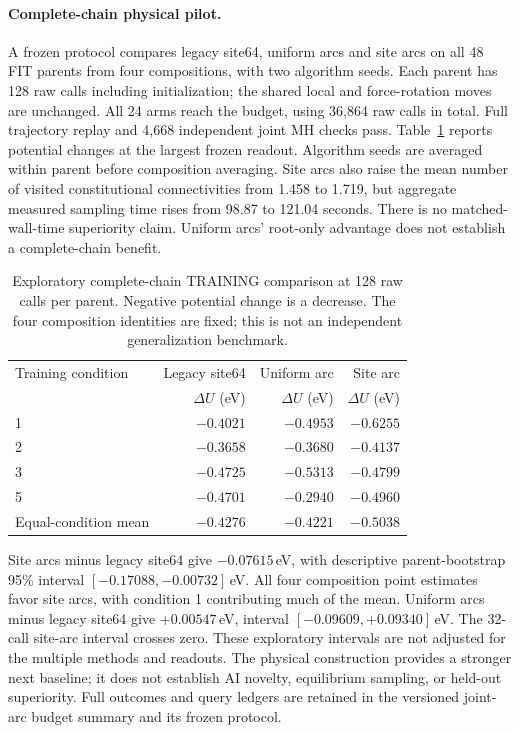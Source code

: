 \paragraph{Complete-chain physical pilot.}
A frozen protocol compares legacy site64, uniform arcs and site arcs on all 48
FIT parents from four compositions, with two algorithm seeds. Each parent has
128 raw calls including initialization; the shared local and force-rotation
moves are unchanged. All 24 arms reach the budget, using 36,864 raw calls in
total. Full trajectory replay and 4,668 independent joint MH checks pass.
Table~\ref{tab:arc-training-chain} reports potential changes at the largest
frozen readout. Algorithm seeds are averaged within parent before composition
averaging. Site arcs also raise the mean number of visited constitutional
connectivities from 1.458 to 1.719, but aggregate measured sampling time rises
from 98.87 to 121.04 seconds. There is no matched-wall-time superiority claim.
Uniform arcs' root-only advantage does not establish a complete-chain benefit.

\begin{table}[t]
\centering
\caption{Exploratory complete-chain TRAINING comparison at 128 raw calls per
parent. Negative potential change is a decrease. The four composition identities
are fixed; this is not an independent generalization benchmark.}
\label{tab:arc-training-chain}
\small
\begin{tabular}{lrrr}
\toprule
Training condition & Legacy site64 & Uniform arc & Site arc\\
 & $\Delta U$ (eV) & $\Delta U$ (eV) & $\Delta U$ (eV)\\
\midrule
1 & $-0.4021$ & $-0.4953$ & $-0.6255$\\
2 & $-0.3658$ & $-0.3680$ & $-0.4137$\\
3 & $-0.4725$ & $-0.5313$ & $-0.4799$\\
5 & $-0.4701$ & $-0.2940$ & $-0.4960$\\
Equal-condition mean & $-0.4276$ & $-0.4221$ & $-0.5038$\\
\bottomrule
\end{tabular}
\end{table}

Site arcs minus legacy site64 give $-0.07615$\,eV, with descriptive parent-bootstrap
95\% interval $[-0.17088,-0.00732]$\,eV. All four composition point estimates favor
site arcs, with condition 1 contributing much of the mean. Uniform arcs minus
legacy site64 give $+0.00547$\,eV, interval $[-0.09609,+0.09340]$\,eV.
The 32-call site-arc interval crosses zero. These exploratory intervals are
not adjusted for the multiple methods and readouts. The physical construction
provides a stronger next baseline; it does not establish AI novelty, equilibrium
sampling, or held-out superiority. Full outcomes and query ledgers are retained
in the versioned joint-arc budget summary and its frozen protocol.

